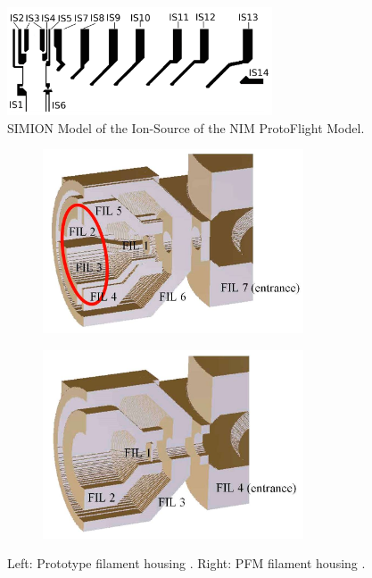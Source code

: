 	\begin{figure}[h] %
		\centering
		\includegraphics[width=0.7\textwidth]{Setup/ISFlight_bearb.png}
		\caption{SIMION Model of the Ion-Source of the NIM ProtoFlight Model.}
		\label{fig:SetupPFMISSim}
	\end{figure}
	\begin{figure}[h!] %
		\begin{subfigure}{0.5\textwidth}
			\centering
			\includegraphics[width =0.85\textwidth]{Setup/Proto_FilEl_sim.jpg}
		\end{subfigure}
		\begin{subfigure}{0.5\textwidth}
			\centering
			\includegraphics[width = 0.85\textwidth]{Setup/PFM_FilEl_sim.jpg}
		\end{subfigure}
		\caption{Left: Prototype filament housing \cite{Diss_Meyer}. Right: PFM filament housing \cite{Diss_Meyer}.}
		\label{fig:SetupFilElSim}
	\end{figure}
